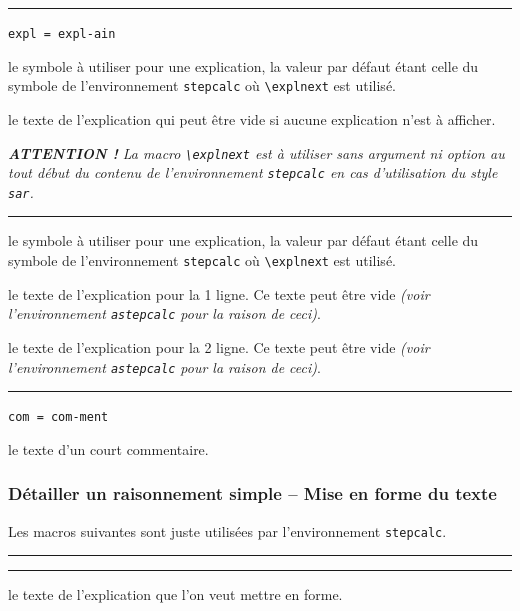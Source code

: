 \documentclass[12pt,a4paper]{article}
\theoremstyle{definition}
\newcommand\env[1]{\texttt{#1}}
\newcommand\macro[1]{\env{\textbackslash{}#1}}
\newcommand\separation{
    \medskip
    \hfill\rule{0.5\textwidth}{0.75pt}\hfill
    \medskip
}
\newcommand\mwhyprefix[2]{%
    \texttt{#1 = #1-#2}%
}
\begin{document}
\separation


  \hfill \mwhyprefix{expl}{ain}

\IDoption{} le symbole à utiliser pour une explication, la valeur par défaut étant celle du symbole de l'environnement \env{stepcalc} où \macro{explnext} est utilisé.

\IDarg{} le texte de l'explication qui peut être vide si aucune explication n'est à afficher.

\medskip

\medskip

\emph{\textbf{ATTENTION !} La macro \macro{explnext} est à utiliser sans argument ni option au tout début du contenu de l'environnement \env{stepcalc} en cas d'utilisation du style \texttt{sar}.}


\separation



\IDoption{} le symbole à utiliser pour une explication, la valeur par défaut étant celle du symbole de l'environnement \env{stepcalc} où \macro{explnext} est utilisé.

 le texte de l'explication pour la 1\iere{} ligne.
          Ce texte peut être vide \emph{(voir l'environnement \env{astepcalc} pour la raison de ceci)}.

 le texte de l'explication pour la 2\ieme{} ligne.
          Ce texte peut être vide \emph{(voir l'environnement \env{astepcalc} pour la raison de ceci)}.


\separation


  \hfill \mwhyprefix{com}{ment}



\IDarg{} le texte d'un court commentaire.




\subsubsection{Détailler un raisonnement simple -- Mise en forme du texte}

Les macros suivantes sont juste utilisées par l'environnement \env{stepcalc}.


\separation




\separation



\IDarg{} le texte de l'explication que l'on veut mettre en forme.
\end{document}
